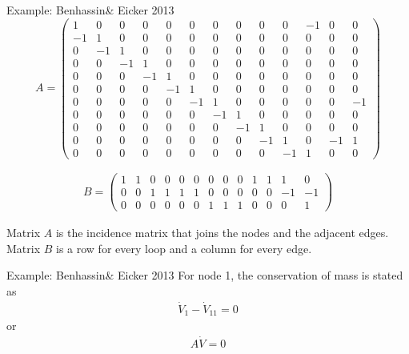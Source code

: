 \documentclass[xcolor=dvipsnames]{beamer}
\newcommand{\dV}{\dot{V}}
\begin{document}
\begin{frame}[fragile,shrink=30]{Example: Benhassin\& Eicker 2013}
\begin{equation*}
	A = 
\begin{pmatrix*}
1 & 0 & 0 & 0 & 0 & 0 & 0 & 0 & 0 & 0 & -1 & 0 & 0\\
-1 & 1 & 0 & 0 & 0 & 0 & 0 & 0 & 0 & 0 & 0  & 0 & 0\\
0 & -1 & 1 & 0 & 0 & 0 & 0 & 0 & 0 & 0 & 0 & 0 & 0\\
0 & 0 & -1 & 1 & 0 & 0 & 0 & 0 & 0 & 0 & 0 & 0 & 0\\
0 & 0 & 0 & -1 & 1 & 0 & 0 & 0 & 0 & 0 & 0 & 0 & 0\\
0 & 0 & 0 & 0 & -1 & 1 & 0 & 0 & 0 & 0 & 0 & 0 & 0\\
0 & 0 & 0 & 0 & 0 & -1 & 1 & 0 & 0 & 0 & 0 & 0 &-1\\
0 & 0 & 0 & 0 & 0 & 0 & -1 & 1 & 0 & 0 & 0 & 0 & 0\\
0 & 0 & 0 & 0 & 0 & 0 & 0 & -1 & 1 & 0 & 0 & 0 & 0\\
0 & 0 & 0 & 0 & 0 & 0 & 0 & 0 & -1 & 1 & 0 & -1 & 1\\
0 & 0 & 0 & 0 & 0 & 0 & 0 & 0 & 0 & -1 & 1 & 0 & 0
\end{pmatrix*}
\end{equation*}

\begin{align*}
	B =
\begin{pmatrix}
	1 & 1 & 0 & 0 & 0 & 0 & 0 & 0 & 0 & 1 & 1 & 1 & 0\\
	0 & 0 & 1 & 1 & 1 & 1 & 0 & 0 & 0 & 0 & 0 & -1 & -1\\
	0 & 0 & 0 & 0 & 0 & 0 & 1 & 1 & 1 & 0 & 0 & 0 & 1
\end{pmatrix}
\end{align*}

Matrix $A$ is the incidence matrix that joins the nodes and the adjacent edges. \\

Matrix $B$ is a row for every loop and a column for every edge.
\end{frame}

\begin{frame}{Example: Benhassin\& Eicker 2013}
	For node 1, the conservation of mass is stated as 
	\begin{align*}
	 	\dV_1-\dV_{11}=0
	 \end{align*} 
	 or
	 \begin{align*}
	 	A\dV = 0
	 \end{align*}
\end{frame}
\end{document}
